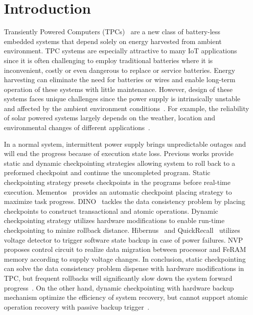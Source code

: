 \section{Introduction} \label{sec:introduction}
Transiently Powered Computers (TPCs)~\cite{Ma2015Architecture, ransford2013transiently, ransford2012mementos} are a new class of battery-less embedded systems that depend solely on energy harvested from ambient environment.
TPC systems are especially attractive to many IoT applications since it is often challenging to employ traditional batteries where it is inconvenient, costly or even dangerous to replace or service batteries. 
Energy harvesting can eliminate the need for batteries or wires and enable long-term operation of these systems with little maintenance.
However, design of these systems faces unique challenges since the power supply is intrinsically unstable and affected by the ambient environment conditions~\cite{Ma2015Architecture, ransford2013transiently,wang2014mppt}.
For example, the reliability of solar powered systems largely depends on the weather, location and environmental changes of different applications~\cite{Abas2015Solar, Alippi2011A, Malaver2014Development, Rojas2015Design}.

In a normal system, intermittent power supply brings unpredictable outages and will end the progress because of execution state loss.
Previous works provide static and dynamic checkpointing strategies allowing system to roll back to a preformed checkpoint and continue the uncompleted program.
Static checkpointing strategy presets checkpoints in the programs before real-time execution.
Mementos~\cite{ransford2012mementos} provides an automatic checkpoint placing strategy to maximize task progress.
DINO~\cite{} tackles the data consistency problem by placing checkpoints to construct transactional and atomic operations. 
Dynamic checkpointing strategy utilizes hardware modifications to enable run-time checkpointing to minize rollback distance. 
Hibernus~\cite{balsamo2015hibernus} and QuickRecall~\cite{} utilizes voltage detector to trigger software state backup in case of power failures. 
NVP~\cite{wang20123us} proposes control circuit to realize data migration between processor and FeRAM  memory according to supply voltage changes.
In conclusion, static checkpointing can solve the data consistency problem dispense with hardware modifications in TPC, but frequent rollbacks will significantly slow down the system forward progress~\cite{Ma2015Architecture}. 
On the other hand, dynamic checkpointing with hardware backup mechanism optimize the efficiency of system recovery, but cannot support atomic operation recovery with passive backup trigger~\cite{Alpaca}.  

